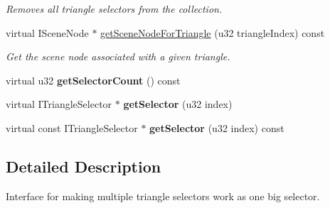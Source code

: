 \begin{DoxyCompactItemize}
\begin{DoxyCompactList}\small\item\em Removes all triangle selectors from the collection. \end{DoxyCompactList}\item 
virtual I\-Scene\-Node $\ast$ \hyperlink{classirr_1_1scene_1_1_c_meta_triangle_selector_aff8cc167cc9c6b7190b514938689268f}{get\-Scene\-Node\-For\-Triangle} (u32 triangle\-Index) const 
\begin{DoxyCompactList}\small\item\em Get the scene node associated with a given triangle. \end{DoxyCompactList}\item 
\hypertarget{classirr_1_1scene_1_1_c_meta_triangle_selector_a61560cf479815a83e89db6f40f0266c4}{virtual u32 {\bfseries get\-Selector\-Count} () const }\label{classirr_1_1scene_1_1_c_meta_triangle_selector_a61560cf479815a83e89db6f40f0266c4}

\item 
\hypertarget{classirr_1_1scene_1_1_c_meta_triangle_selector_a15b4a6b6073828afc30eba3f8311ddb6}{virtual I\-Triangle\-Selector $\ast$ {\bfseries get\-Selector} (u32 index)}\label{classirr_1_1scene_1_1_c_meta_triangle_selector_a15b4a6b6073828afc30eba3f8311ddb6}

\item 
\hypertarget{classirr_1_1scene_1_1_c_meta_triangle_selector_abbc64a47a7e28c37fe4caa3f01b1f248}{virtual const I\-Triangle\-Selector $\ast$ {\bfseries get\-Selector} (u32 index) const }\label{classirr_1_1scene_1_1_c_meta_triangle_selector_abbc64a47a7e28c37fe4caa3f01b1f248}

\end{DoxyCompactItemize}


\subsection{Detailed Description}
Interface for making multiple triangle selectors work as one big selector. 

